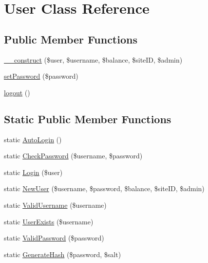\hypertarget{class_user}{\section{User Class Reference}
\label{class_user}
}
\subsection*{Public Member Functions}
\begin{DoxyCompactItemize}
\item 
\hyperlink{class_user_a6795462ff53bc37a7c99481c4cb4b5f6}{\-\_\-\-\_\-construct} (\$user, \$username, \$balance, \$site\-I\-D, \$admin)
\item 
\hyperlink{class_user_a3e35c8d3dbb2c513c618a664389e0926}{set\-Password} (\$password)
\item 
\hyperlink{class_user_a082405d89acd6835c3a7c7a08a7adbab}{logout} ()
\end{DoxyCompactItemize}
\subsection*{Static Public Member Functions}
\begin{DoxyCompactItemize}
\item 
static \hyperlink{class_user_a9c058a346a08a797dd8df3ecdafa4d64}{Auto\-Login} ()
\item 
static \hyperlink{class_user_a3a60c336c7bd080d1945d5f4bc204ec2}{Check\-Password} (\$username, \$password)
\item 
static \hyperlink{class_user_a3f3ecd6f91f8c9481453a1d88413f6d0}{Login} (\$user)
\item 
static \hyperlink{class_user_aa6458193f8ce8e1ca5384b5e354ded0e}{New\-User} (\$username, \$password, \$balance, \$site\-I\-D, \$admin)
\item 
static \hyperlink{class_user_a1b997bee7f3e082a75e739fcb90d8cac}{Valid\-Username} (\$username)
\item 
static \hyperlink{class_user_a5a68d9b0c4755a1a15d3801aef20e44f}{User\-Exists} (\$username)
\item 
static \hyperlink{class_user_aa354867c8863229e4d62f42d8fbbad61}{Valid\-Password} (\$password)
\item 
static \hyperlink{class_user_a6f1cf077fd3545f7d28cd34c26cc7d47}{Generate\-Hash} (\$password, \$salt)
\end{DoxyCompactItemize}
